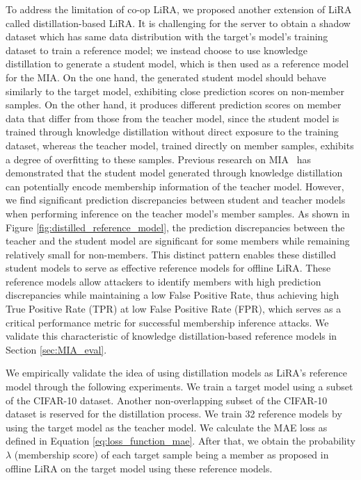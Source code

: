  To address the limitation of co-op LiRA, we proposed another extension of LiRA called distillation-based LiRA.
It is challenging for the server to obtain a shadow dataset which has same data distribution with the target's model's training dataset to train a reference model; we instead choose to use knowledge distillation to generate a student model, which is then used as a reference model for the MIA. 
On the one hand, the generated student model should behave similarly to the target model, exhibiting close prediction scores on non-member samples.
On the other hand, it produces different prediction scores on member data that differ from those from the teacher model, since the student model is trained through knowledge distillation without direct exposure to the training dataset, whereas the teacher model, trained directly on member samples, exhibits a degree of overfitting to these samples.
Previous research on MIA~\cite{jagielski2024students} has demonstrated that the student model generated through knowledge distillation can potentially encode membership information of the teacher model. 
However, we find significant prediction discrepancies between student and teacher models when performing inference on the teacher model's member samples. As shown in Figure \ref{fig:distilled_reference_model}, the prediction discrepancies between the teacher and the student model are significant for some members while remaining relatively small for non-members. 
This distinct pattern enables these distilled student models to serve as effective reference models for offline LiRA. 
These reference models allow attackers to identify members with high prediction discrepancies while maintaining a low False Positive Rate, thus achieving high True Positive Rate (TPR) at low False Positive Rate (FPR), which serves as a critical performance metric for successful membership inference attacks\cite{carlini2022membership, watson2021importance}. 
We validate this characteristic of knowledge distillation-based reference models in Section \ref{sec:MIA_eval}.

\iffalse
We empirically validate the idea of using distillation models as LiRA's reference model through the following experiments.
We train a target model using a subset of the CIFAR-10 dataset.
Another non-overlapping subset of the CIFAR-10 dataset is reserved for the distillation process.
We train 32 reference models by using the target model as the teacher model. 
We calculate the MAE loss as defined in Equation \ref{eq:loss_function_mae}.
After that, we obtain the probability $\lambda$ (membership score) of each target sample being a member as proposed in offline LiRA on the target model using these reference models.

